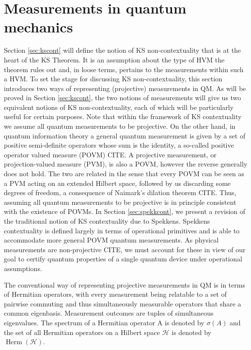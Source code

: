 \section{Measurements in quantum mechanics}
\label{sec:mnts}
Section \ref{sec:kscont} will define the notion of KS non-contextuality that is at the heart of the KS Theorem. It is an assumption about the type of HVM the theorem rules out and, in loose terms, pertains to the measurements within such a HVM. To set the stage for discussing KS non-contextuality, this section introduces two ways of representing (projective) measurements in QM. As will be proved in Section \ref{sec:kscont}, the two notions of measurements will give us two equivalent notions of KS non-contextuality, each of which will be particularly useful for certain purposes. Note that within the framework of KS contextuality we assume all quantum measurements to be projective. On the other hand, in quantum information theory a general quantum measurement is given by a set of positive semi-definite operators whose sum is the identity, a so-called positive operator valued measure (POVM) CITE. A projective measurement, or projection-valued measure (PVM), is also a POVM, however the reverse generally does not hold. The two are related in the sense that every POVM can be seen as a PVM acting on an extended Hilbert space, followed by us discarding some degrees of freedom, a consequence of Naimark's dilation theorem CITE. Thus, assuming all quantum measurements to be projective is in principle consistent with the existence of POVMs. In Section \ref{sec:spekkcont}, we present a revision of the traditional notion of KS contextuality due to Spekkens. Spekkens contextuality is defined largely in terms of operational primitives and is able to accommodate more general POVM quantum measurements. As physical measurements are non-projective CITE, we must account for these in view of our goal to certify quantum properties of a single quantum device under operational assumptions.

The conventional way of representing projective measurements in QM is in terms of Hermitian operators, with every measurement being relatable to a set of pairwise commuting and thus simultaneously measurable operators that share a common eigenbasis. Measurement outcomes are tuples of simultaneous eigenvalues. The spectrum of a Hermitian operator A is denoted by $\sigma(A)$ and the set of all Hermitian operators on a Hilbert space $\mathcal{H}$ is denoted by $\operatorname{Herm}(\mathcal{H})$. 

